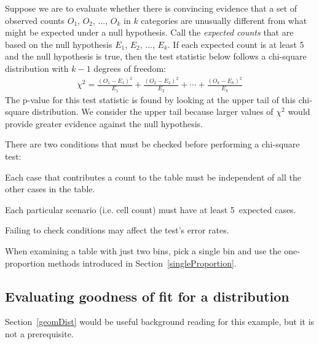 \begin{termBox}{
Suppose we are to evaluate whether there is convincing evidence that a set of observed counts $O_1$, $O_2$, ..., $O_k$ in $k$ categories are unusually different from what might be expected under a null hypothesis. Call the \emph{expected counts} that are based on the null hypothesis $E_1$, $E_2$, ..., $E_k$. If each expected count is at least 5 and the null hypothesis is true, then the test statistic below follows a chi-square distribution with $k-1$ degrees of freedom:
\begin{align*}
\chi^2 = \frac{(O_1 - E_1)^2}{E_1} + \frac{(O_2 - E_2)^2}{E_2} + \cdots + \frac{(O_k - E_k)^2}{E_k}
\end{align*}
The p-value for this test statistic is found by looking at the upper tail of this chi-square distribution. We consider the upper tail because larger values of $\chi^2$ would provide greater evidence against the null hypothesis.}
\end{termBox}

\begin{tipBox}{
There are two conditions that must be checked before performing a chi-square test:\vspace{-1mm}
\begin{description}
\setlength{\itemsep}{0mm}
\item[Independence.] Each case that contributes a count to the table must be independent of all the other cases in the table.
\item[Sample size / distribution.] Each particular scenario (i.e. cell count) must have at least 5~expected cases.
\vspace{-1mm}
\end{description}
Failing to check conditions may affect the test's error rates.}
\end{tipBox}

When examining a table with just two bins, pick a single bin and use the one-proportion methods introduced in Section~\ref{singleProportion}.


\subsection{Evaluating goodness of fit for a distribution}

Section~\ref{geomDist} would be useful background reading for this example, but it is not a prerequisite.

